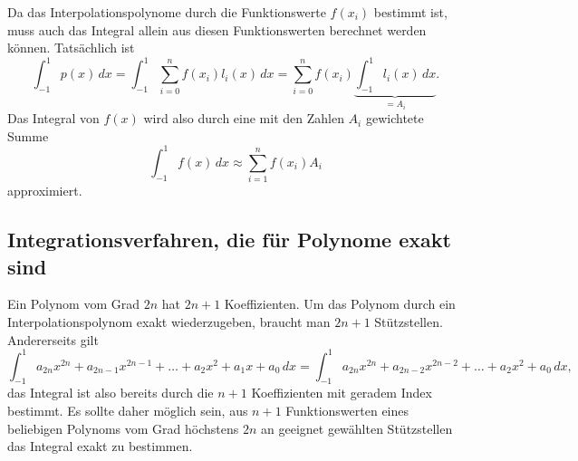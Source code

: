 Da das Interpolationspolynome durch die Funktionswerte $f(x_i)$
bestimmt ist, muss auch das Integral allein aus diesen Funktionswerten
berechnet werden können.
Tatsächlich ist
\begin{equation}
\int_{-1}^1 p(x)\,dx
=
\int_{-1}^1 \sum_{i=0}^n f(x_i)l_i(x)\,dx
=
\sum_{i=0}^n f(x_i)
\underbrace{\int_{-1}^1
l_i(x)\,dx}_{\displaystyle = A_i}.
\label{buch:integral:gaussquadratur:eqn:Aidef}
\end{equation}
Das Integral von $f(x)$ wird also durch eine mit den Zahlen $A_i$
gewichtete Summe
\[
\int_{-1}^1 f(x)\,dx
\approx
\sum_{i=1}^n f(x_i)A_i
\]
approximiert.

\subsection{Integrationsverfahren, die für Polynome exakt sind}
Ein Polynom vom Grad $2n$ hat $2n+1$ Koeffizienten.
Um das Polynom durch ein Interpolationspolynom exakt wiederzugeben,
braucht man $2n+1$ Stützstellen.
Andererseits gilt
\[
\int_{-1}^1 a_{2n}x^{2n} + a_{2n-1}x^{2n-1} + \dots + a_2x^2 + a_1x + a_0\,dx
=
\int_{-1}^1 a_{2n}x^{2n} + a_{2n-2}x^{2n-2}+\dots +a_2x^2 +a_0\,dx,
\]
das Integral ist also bereits durch die $n+1$ Koeffizienten mit geradem
Index bestimmt.
Es sollte daher möglich sein, aus $n+1$ Funktionswerten eines beliebigen
Polynoms vom Grad höchstens $2n$ an geeignet gewählten Stützstellen das
Integral exakt zu bestimmen.


